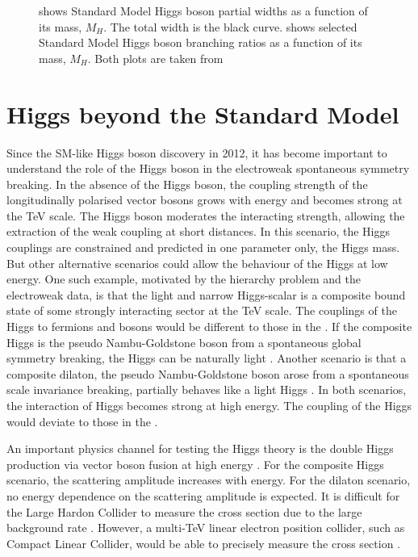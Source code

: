\begin{figure}[tbph]
\begin{subfigure}[b]{0.45\textwidth}
        \caption{}
        \label{fig:theoryHiggsBranchingRatio}
    \end{subfigure}
\caption[SM Higgs boson decay width and branching ratios]%
{ shows Standard Model Higgs boson partial widths as a function of its mass, $M_H$. The total width is the black curve.  shows selected Standard Model Higgs boson branching ratios as a function of its mass, $M_H$. Both plots are taken from \cite{Rainwater:2007cp} }
\label{fig:theoryHiggsPhenomenology}
\end{figure}


\section{Higgs beyond the Standard Model}
\label{sec:theoryHiggsBSM}

Since the SM-like Higgs boson discovery in 2012, it has become important to understand the role of the Higgs boson in the electroweak spontaneous symmetry breaking. In the absence of the Higgs boson, the coupling strength of the longitudinally polarised vector bosons grows with energy and becomes strong at the TeV scale. The \SM Higgs boson moderates the interacting strength, allowing the extraction of the weak coupling at short distances. In this scenario, the \SM Higgs couplings are constrained and predicted in one parameter only, the Higgs mass. But other alternative scenarios could allow the behaviour of the \SM Higgs at low energy. One such example, motivated by the hierarchy problem and the electroweak data, is that the light and narrow Higgs-scalar is a composite bound state of some strongly interacting sector at the TeV scale. The couplings of the Higgs to fermions and bosons would be different to those in the \SM. If the composite Higgs is the pseudo Nambu-Goldstone boson from a spontaneous global symmetry breaking, the Higgs can be naturally light \cite{Kaplan:1983fs}. Another scenario is that a composite dilaton, the pseudo Nambu-Goldstone boson arose from a spontaneous scale invariance breaking, partially behaves like a light Higgs \cite{Goldberger:2008zz}. In both scenarios, the interaction of Higgs becomes strong at high energy. The coupling of the Higgs would deviate to those in the \SM.

An important physics channel for testing the Higgs theory is the double Higgs production via vector boson fusion at high energy \cite{Giudice:2007fh,Contino:2010mh,Contino:2013gna}. For the composite Higgs scenario, the scattering amplitude increases with energy. For the dilaton scenario, no energy dependence on the scattering amplitude is expected. It is difficult for the Large Hardon Collider to measure the cross section due to the large \SM background rate \cite{Contino:2010mh}. However, a multi-TeV linear electron position collider, such as Compact Linear Collider, would be able to precisely measure the cross section \cite{Barger:2003rs}.

